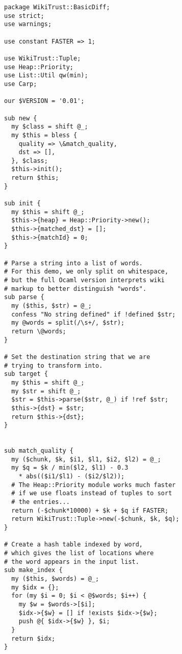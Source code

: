 \begin{lstlisting}
package WikiTrust::BasicDiff;
use strict;
use warnings;

use constant FASTER => 1;

use WikiTrust::Tuple;
use Heap::Priority;
use List::Util qw(min);
use Carp;

our $VERSION = '0.01';

sub new {
  my $class = shift @_;
  my $this = bless {
    quality => \&match_quality,
    dst => [],
  }, $class;
  $this->init();
  return $this;
}

sub init {
  my $this = shift @_;
  $this->{heap} = Heap::Priority->new();
  $this->{matched_dst} = [];
  $this->{matchId} = 0;
}

# Parse a string into a list of words.
# For this demo, we only split on whitespace,
# but the full Ocaml version interprets wiki
# markup to better distinguish "words".
sub parse {
  my ($this, $str) = @_;
  confess "No string defined" if !defined $str;
  my @words = split(/\s+/, $str);
  return \@words;
}

# Set the destination string that we are
# trying to transform into.
sub target {
  my $this = shift @_;
  my $str = shift @_;
  $str = $this->parse($str, @_) if !ref $str;
  $this->{dst} = $str;
  return $this->{dst};
}


sub match_quality {
  my ($chunk, $k, $i1, $l1, $i2, $l2) = @_;
  my $q = $k / min($l2, $l1) - 0.3
    * abs(($i1/$l1) - ($i2/$l2));
  # The Heap::Priority module works much faster
  # if we use floats instead of tuples to sort
  # the entries...
  return (-$chunk*10000) + $k + $q if FASTER;
  return WikiTrust::Tuple->new(-$chunk, $k, $q);
}

# Create a hash table indexed by word,
# which gives the list of locations where
# the word appears in the input list.
sub make_index {
  my ($this, $words) = @_;
  my $idx = {};
  for (my $i = 0; $i < @$words; $i++) {
    my $w = $words->[$i];
    $idx->{$w} = [] if !exists $idx->{$w};
    push @{ $idx->{$w} }, $i;
  }
  return $idx;
}


\end{lstlisting}
